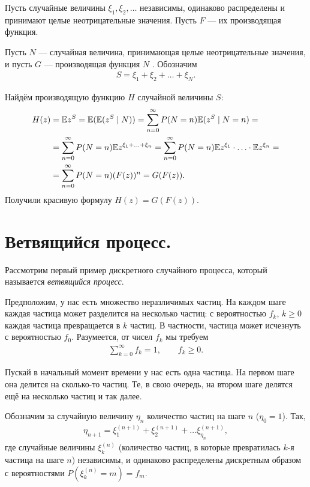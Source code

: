 \documentclass[../main.tex]{subfiles}
\begin{document}
\begin{exmpl}
 \label{example:genfun_of_random_number_of_random_values}
 Пусть случайные величины $ \xi_1, \xi_2, \ldots $  независимы, одинаково распределены и принимают целые неотрицательные значения. Пусть $ F $ --- их производящая функция.

 Пусть  $ N $  --- случайная величина, принимающая целые неотрицательные значения, и пусть $ G $  --- производящая функция $ N $ . Обозначим
 \begin{align*}
  S = \xi_1 + \xi_2 + \ldots + \xi_N.
 \end{align*}

 Найдём производящую функцию $ H $ случайной величины $ S $:
 \begin{align*}
  H(z) &= \mathbb E z^{S} = \mathbb E(\mathbb E(z^{S} \mid N)) = \sum_{n=0}^{\infty} P(N=n) \mathbb E(z^{S} \mid N = n) = \\
  &= \sum_{n=0}^{\infty}P(N=n) \mathbb E z^{\xi_1+\ldots+\xi_n} = \sum_{n=0}^{\infty} P(N=n) \mathbb E z^{\xi_1} \cdot \ldots \cdot \mathbb E z^{\xi_n} = \\
  &= \sum_{n=0}^{\infty} P(N=n) (F(z))^{n} = G(F(z)).
 \end{align*} Получили красивую формулу $ H(z) = G(F(z)) $.
\end{exmpl}

\newpage
\section{Ветвящийся процесс.}

Рассмотрим первый пример дискретного случайного процесса, который называется \textit{ветвящийся процесс}.

Предположим, у нас есть множество неразличимых частиц. На каждом шаге каждая частица может разделится на несколько частиц: с вероятностью $ f_k $,  $ k \geqslant 0 $ каждая частица превращается в $ k $  частиц.  В частности, частица может исчезнуть с вероятностью $ f_0 $. Разумеется, от чисел $ f_k $ мы требуем
\begin{align*}
 \sum_{k=0}^{\infty}f_k = 1, \qquad f_k \geqslant 0.
\end{align*}

Пускай в начальный момент времени у нас есть одна частица. На первом шаге она делится на сколько-то частиц. Те, в свою очередь, на втором шаге делятся ещё на несколько частиц и так далее.

Обозначим за случайную величину $ \eta_n $ количество частиц на шаге $ n $ ($ \eta_0 = 1 $). Так,
\begin{align}
 \label{eq:eta_branching_process}
 \eta_{n+1} = \xi^{(n+1)}_{1} + \xi^{(n+1)}_2 + \ldots \xi^{(n+1)}_{\eta_n},
\end{align} где случайные величины $ \xi^{(n)}_k $ (количество частиц, в которые превратилась $ k $-я частица на шаге $ n $) независимы, и одинаково распределены дискретным образом с вероятностями $ P(\xi^{(n)}_k = m) = f_m $.
\end{document}
